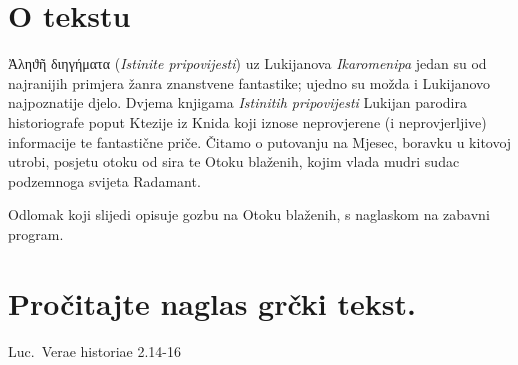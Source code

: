 


\section*{O tekstu}

\textgreek[variant=ancient]{Ἀληϑῆ διηγήματα} (\textit{Istinite pripovijesti}) uz Lukijanova \textit{Ikaromenipa} jedan su od najranijih primjera žanra znanstvene fantastike; ujedno su možda i Lukijanovo najpoznatije djelo. Dvjema knjigama \textit{Istinitih pripovijesti} Lukijan parodira historiografe poput Ktezije iz Knida koji iznose neprovjerene (i neprovjerljive) informacije te fantastične priče. Čitamo o putovanju na Mjesec, boravku u kitovoj utrobi, posjetu otoku od sira te Otoku blaženih, kojim vlada mudri sudac podzemnoga svijeta Radamant. 

Odlomak koji slijedi opisuje gozbu na Otoku blaženih, s naglaskom na zabavni program.


\section*{Pročitajte naglas grčki tekst.}

Luc.\ Verae historiae 2.14-16


\medskip


